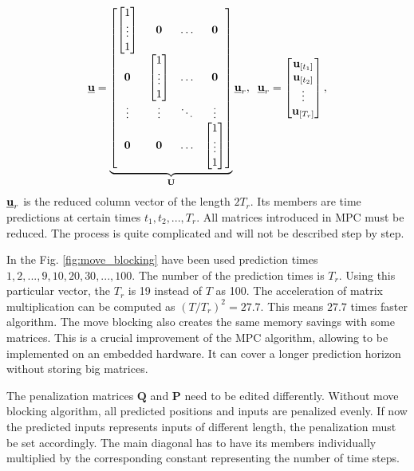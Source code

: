 \documentclass[a4paper,11pt,titlepage]{article}
\newcommand{\uvec}{\textbf{\underline{u}}}
\newcommand{\urvec}{\textbf{\underline{u}}_r}
\begin{document}
\begin{equation}
\uvec = \underbrace{\begin{bmatrix}
\begin{bmatrix}
1\\
\vdots\\
1
\end{bmatrix} & \textbf{0} & \hdots & \textbf{0} \\
\textbf{0} & \begin{bmatrix}
1\\
\vdots\\
1
\end{bmatrix} & \hdots & \textbf{0}\\
\vdots & \vdots & \ddots & \vdots \\
\textbf{0} & \textbf{0} & \hdots & \begin{bmatrix}
1\\
\vdots\\
1
\end{bmatrix}
\end{bmatrix}}_{\textbf{U}}\urvec, \;\;
\urvec = \begin{bmatrix}
\textbf{u}_{[t_1]} \\
\textbf{u}_{[t_2]} \\
\vdots \\
\textbf{u}_{[T_r]}
\end{bmatrix},
\label{eq:moveblocking_example}
\end{equation}
$\urvec$ is the reduced column vector of the length $2T_r$. Its members are time predictions at certain times $t_1, t_2, ..., T_r$. All matrices introduced in MPC must be reduced. The process is quite complicated and will not be described step by step. 

In the Fig. \ref{fig:move_blocking} have been used prediction times $1, 2, ..., 9, 10, 20, 30, ..., 100.$ The number of the prediction times is $T_r$. Using this particular vector, the $T_r$ is 19 instead of $T$ as 100. The acceleration of matrix multiplication can be computed as $(T/T_r)^2 = 27.7$. This means $27.7$ times faster algorithm. The move blocking also creates the same memory savings with some matrices. This is a crucial improvement of the MPC algorithm, allowing to be implemented on an embedded hardware. It can cover a longer prediction horizon without storing big matrices.

The penalization matrices $\textbf{Q}$ and $\textbf{P}$ need to be edited differently. Without move blocking algorithm, all predicted positions and inputs are penalized evenly. If now the predicted inputs represents inputs of different length, the penalization must be set accordingly. The main diagonal has to have its members individually multiplied by the corresponding constant representing the number of time steps. 
\end{document}

